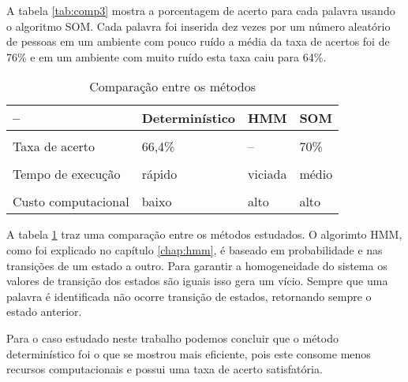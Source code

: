 A tabela \ref{tab:comp3} mostra  a porcentagem de acerto para cada palavra usando o algoritmo SOM. Cada palavra foi inserida dez vezes por um número aleatório de pessoas  em um ambiente com pouco ruído a média da taxa de acertos foi de 76\% e em um ambiente com muito ruído esta taxa caiu para 64\%.

\begin{table}[H]
\centering
\caption{Comparação entre os métodos}
\label{tab:comp5}
\smallskip
\begin{tabular}{|l|l|l|l|}
\hline
 -- & Determinístico & HMM & SOM\\[0.5ex]
\hline
&&&\\[-2ex]
Taxa de acerto & 66,4\% &  -- &  70\%\\[0.5ex]
\hline
&&&\\[-2ex]
Tempo de execução & rápido &  viciada &  médio \\[0.5ex]
\hline
&&&\\[-2ex]
Custo computacional & baixo & alto & alto\\[0.5ex]
\hline
\end{tabular}
\end{table}

A tabela \ref{tab:comp5} traz uma comparação entre os métodos estudados. O algorimto HMM, como foi explicado no capítulo \ref{chap:hmm}, é baseado em probabilidade e nas transições de um estado a outro. Para garantir a homogeneidade do sistema
os valores de transição dos estados são iguais isso gera um vício. Sempre que uma palavra é identificada não ocorre transição de estados, retornando sempre o estado anterior.

Para o caso estudado neste trabalho podemos concluir que o  método determinístico foi o que se mostrou mais eficiente, pois este consome menos recursos computacionais e possui uma taxa de acerto satisfatória.















































 

